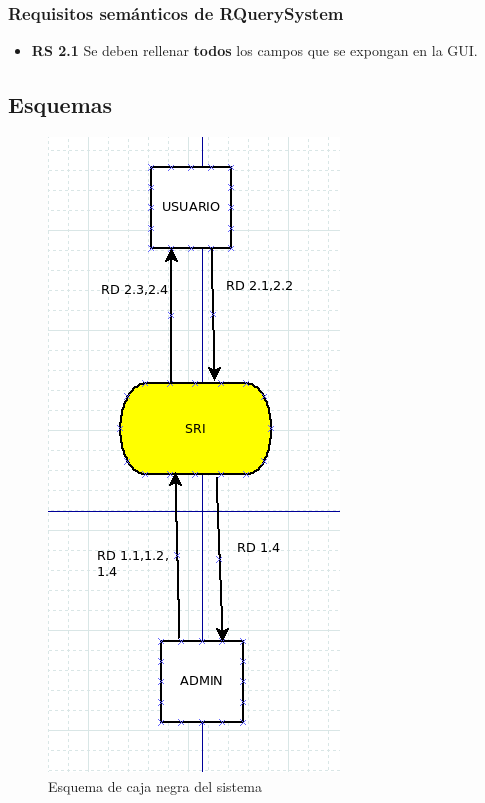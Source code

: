 \subsubsection{Requisitos semánticos de RQuerySystem}
\begin{itemize}
	\item \textbf{RS 2.1} Se deben rellenar \textbf{todos} los campos que se expongan en la GUI.
\end{itemize}

\subsection{Esquemas}

\begin{figure}[H] %
	\centering
	\includegraphics[scale=0.5]{caja-negra.png}  %
	\caption{Esquema de caja negra del sistema} 
\end{figure}

